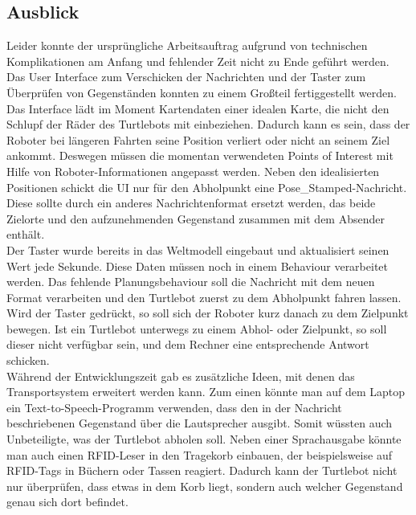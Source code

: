 \documentclass[a4paper,12pt,headsepline]{scrartcl}
\begin{document}
	
	\subsection{Ausblick}
		Leider konnte der ursprüngliche Arbeitsauftrag aufgrund von technischen Komplikationen am Anfang und fehlender Zeit nicht zu Ende geführt werden. Das User Interface zum Verschicken der Nachrichten und der Taster zum Überprüfen von Gegenständen konnten zu einem Großteil fertiggestellt werden.\\
		Das Interface lädt im Moment Kartendaten einer idealen Karte, die nicht den Schlupf der Räder des Turtlebots mit einbeziehen. Dadurch kann es sein, dass der Roboter bei längeren Fahrten seine Position verliert oder nicht an seinem Ziel ankommt. Deswegen müssen die momentan verwendeten Points of Interest mit Hilfe von Roboter-Informationen angepasst werden. Neben den idealisierten Positionen schickt die UI nur für den Abholpunkt eine \glqq Pose{\_}Stamped\grqq-Nachricht. Diese sollte durch ein anderes Nachrichtenformat ersetzt werden, das beide Zielorte und den aufzunehmenden Gegenstand zusammen mit dem Absender enthält.\\
		Der Taster wurde bereits in das Weltmodell eingebaut und aktualisiert seinen Wert jede Sekunde. Diese Daten müssen noch in einem Behaviour verarbeitet werden. Das fehlende Planungsbehaviour soll die Nachricht mit dem neuen Format verarbeiten und den Turtlebot zuerst zu dem Abholpunkt fahren lassen. Wird der Taster gedrückt, so soll sich der Roboter kurz danach zu dem Zielpunkt bewegen. Ist ein Turtlebot unterwegs zu einem Abhol- oder Zielpunkt, so soll dieser nicht verfügbar sein, und dem Rechner eine entsprechende Antwort schicken.\\
		Während der Entwicklungszeit gab es zusätzliche Ideen, mit denen das Transportsystem erweitert werden kann. Zum einen könnte man auf dem Laptop ein Text-to-Speech-Programm verwenden, dass den in der Nachricht beschriebenen Gegenstand über die Lautsprecher ausgibt. Somit wüssten auch Unbeteiligte, was der Turtlebot abholen soll. Neben einer Sprachausgabe könnte man auch einen RFID-Leser in den Tragekorb einbauen, der beispielsweise auf RFID-Tags in Büchern oder Tassen reagiert. Dadurch kann der Turtlebot nicht nur überprüfen, dass etwas in dem Korb liegt, sondern auch welcher Gegenstand genau sich dort befindet.
		
\end{document}
